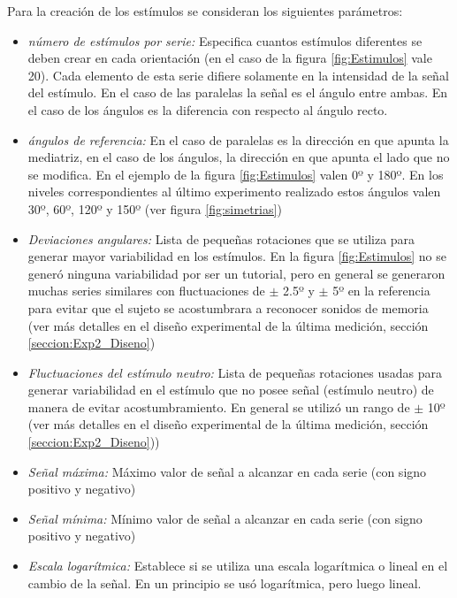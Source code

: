 \documentclass{article}
\numberwithin{figure}{section}
\begin{document}
    
    Para la creación de los estímulos se consideran los siguientes parámetros: 
    \begin{itemize}
        \item \textit{número de estímulos por serie:} Especifica cuantos estímulos diferentes se deben crear en cada orientación (en el caso de la figura \ref{fig:Estimulos} vale 20). Cada elemento de esta serie difiere solamente en la intensidad de la señal del estímulo. En el caso de las paralelas la señal es el ángulo entre ambas. En el caso de los ángulos es la diferencia con respecto al ángulo recto.
        \item \textit{ángulos de referencia:} En el caso de paralelas es la dirección en que apunta la mediatriz, en el caso de los ángulos, la dirección en que apunta el lado que no se modifica. En el ejemplo de la figura \ref{fig:Estimulos} valen 0º y 180º. En los niveles correspondientes al último experimento realizado estos ángulos valen 30º, 60º, 120º y 150º (ver figura \ref{fig:simetrias}) 
        \item \textit{Deviaciones angulares:} Lista de pequeñas rotaciones que se utiliza para generar mayor variabilidad en los estímulos. En la figura \ref{fig:Estimulos} no se generó ninguna variabilidad por ser un tutorial, pero en general se generaron muchas series similares con fluctuaciones de $\pm$ 2.5º y $\pm$ 5º en la referencia para evitar que el sujeto se acostumbrara a reconocer sonidos de memoria (ver más detalles en el diseño experimental de la última medición, sección \ref{seccion:Exp2_Diseno})
        \item \textit{Fluctuaciones del estímulo neutro:} Lista de pequeñas rotaciones usadas para generar variabilidad en el estímulo que no posee señal (estímulo neutro) de manera de evitar acostumbramiento. En general se utilizó un rango de $\pm$ 10º  (ver más detalles en el diseño experimental de la última medición, sección \ref{seccion:Exp2_Diseno}))
        \item \textit{Señal máxima:} Máximo valor de señal a alcanzar en cada serie (con signo positivo y negativo)
        \item \textit{Señal mínima:} Mínimo valor de señal a alcanzar en cada serie (con signo positivo y negativo)
        \item \textit{Escala logarítmica:} Establece si se utiliza una escala logarítmica o lineal en el cambio de la señal. En un principio se usó logarítmica, pero luego lineal. 
    \end{itemize}
    
\end{document}
